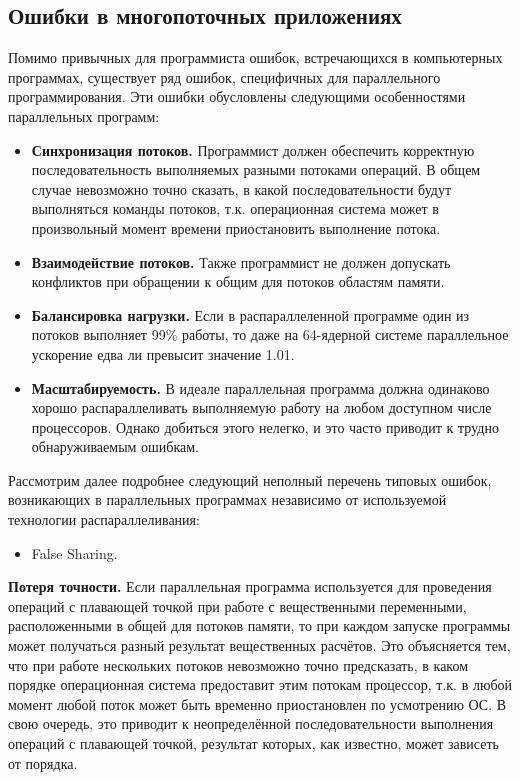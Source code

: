 \subsection{Ошибки в многопоточных приложениях}

Помимо привычных для программиста ошибок, встречающихся в компьютерных программах, существует ряд ошибок, специфичных для параллельного программирования. Эти ошибки обусловлены следующими особенностями параллельных программ:

\begin{itemize}
    \item\textbf{Синхронизация потоков.} Программист должен обеспечить корректную последовательность выполняемых разными потоками операций. В общем случае невозможно точно сказать, в какой последовательности будут выполняться команды потоков, т.к. операционная система может в произвольный момент времени приостановить выполнение потока.
    \item\textbf{Взаимодействие потоков.} Также программист не должен допускать конфликтов при обращении к общим для потоков областям памяти. 
    \item\textbf{Балансировка нагрузки.} Если в распараллеленной программе один из потоков выполняет 99\% работы, то даже на 64-ядерной системе параллельное ускорение едва ли превысит значение 1.01.
    \item\textbf{Масштабируемость.} В идеале параллельная программа должна одинаково хорошо распараллеливать выполняемую работу на любом доступном числе процессоров. Однако добиться этого нелегко, и это часто приводит к трудно обнаруживаемым ошибкам.
\end{itemize}

Рассмотрим далее подробнее следующий неполный перечень типовых ошибок, возникающих в параллельных программах независимо от используемой технологии распараллеливания:

\begin{itemize}
     точности операций с плавающей точкой.
     блокировки (deadlock).
     гонки (race conditions). 
     АВА.
     приоритетов.
     (starvation).
    \item False Sharing.
\end{itemize}

\textbf{Потеря точности.} Если параллельная программа используется для проведения операций с плавающей точкой при работе с вещественными переменными, расположенными в общей для потоков памяти, то при каждом запуске программы может получаться разный результат вещественных расчётов. Это объясняется тем, что при работе нескольких потоков невозможно точно предсказать, в каком порядке операционная система предоставит этим потокам процессор, т.к. в любой момент любой поток может быть временно приостановлен по усмотрению ОС. В свою очередь, это приводит к неопределённой последовательности выполнения операций с плавающей точкой, результат которых, как известно, может зависеть от порядка.

